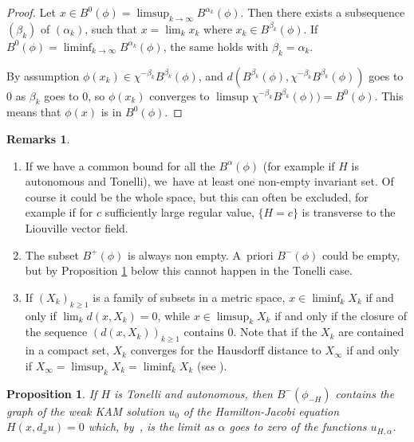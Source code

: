 \documentclass[JEP,XML,SOM,Unicode,NoFloatCountersInSection,published]{cedram}
\newtheorem{prop}[thm]{Proposition}
\theoremstyle{definition}
\newtheorem{rems}[thm]{Remarks}
\begin{document}
\begin{proof}
Let $x\in B_{}^0(\phi)=\limsup_{k\to\infty}B^{\alpha_k}(\phi)$.
Then there exists a subsequence $(\beta_k)$ of $(\alpha_k)$, such that $x=\lim_kx_k$ where $x_k\in B_{}^{\beta_k}(\phi)$. If~$B_{}^0(\phi)=\liminf_{k\to\infty}B^{\alpha_k}(\phi)$, the same holds with $\beta_k=\alpha_k$.

By assumption $\phi(x_k)\in \chi^{-\beta_k}B^{\beta_k}(\phi)$, and $d(B^{\beta_k}(\phi), \chi^{-\beta_k}B^{\beta_k}(\phi))$ goes to $0$ as $\beta_k$ goes to $0$, so $\phi(x_k)$ converges to $\limsup \chi^{-\beta_k}B^{\beta_k}(\phi))=B^0(\phi)$. This means that $\phi(x)$ is in $B^0(\phi)$.
\end{proof}

\skpt
\begin{rems}
\begin{enumerate}
\item If we have a common bound for all the $B^\alpha(\phi)$ (for example if $H$ is autonomous and Tonelli), we~have at least one non-empty invariant set. Of course it could be the whole space, but this can often be excluded, for example if for $c$ sufficiently large regular value, $\{H=c\}$ is transverse to the Liouville vector field.
\item The subset $B^+(\phi)$ is always non empty. A~priori $B^-(\phi)$ could be empty, but by Proposition \ref{prop:weakKAM-non-discounted} below this cannot happen in the Tonelli case.
\item If $(X_k)_{k\geq 1}$ is a family of subsets in a metric space, $x\in \liminf_k X_k$ if and only if $\lim_k d(x,X_k)=0$,
while $x\in \limsup_k X_k$ if and only if the closure of the sequence $(d(x,X_k))_{k\geq 1}$ contains $0$.
Note that if the $X_k$ are contained in a compact set, $X_k$ converges for the Hausdorff distance to $X_\infty$ if and only if $X_\infty=\limsup_k X_k=\liminf_k X_k$ (see \cite[pp.\,25-26]{Kechris}).
\end{enumerate}
\end{rems}

\begin{prop}\label{prop:weakKAM-non-discounted} If $H$ is Tonelli and autonomous, then $B^-(\phi_{-H})$ contains the graph of the weak KAM solution $u_0$ of the Hamilton-Jacobi equation $H(x,d_xu)=0$ which, by~\cite{DFIZ}, is the limit as $\alpha$ goes to zero of the functions $u_{H,\alpha}$.
\end{prop}
\end{document}
